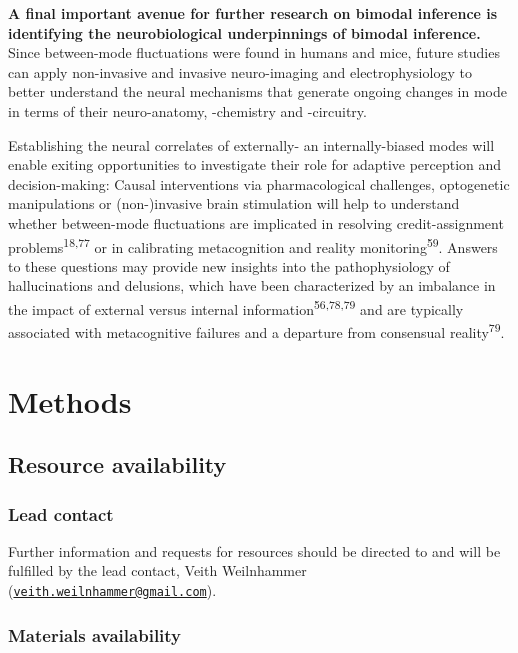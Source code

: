 \documentclass[
]{article}
\begin{document}
\textbf{A final important avenue for further research on bimodal
inference is identifying the neurobiological underpinnings of bimodal
inference.} Since between-mode fluctuations were found in humans and
mice, future studies can apply non-invasive and invasive neuro-imaging
and electrophysiology to better understand the neural mechanisms that
generate ongoing changes in mode in terms of their neuro-anatomy,
-chemistry and -circuitry.

Establishing the neural correlates of externally- an internally-biased
modes will enable exiting opportunities to investigate their role for
adaptive perception and decision-making: Causal interventions via
pharmacological challenges, optogenetic manipulations or (non-)invasive
brain stimulation will help to understand whether between-mode
fluctuations are implicated in resolving credit-assignment
problems\textsuperscript{18,77} or in calibrating metacognition and
reality monitoring\textsuperscript{59}. Answers to these questions may
provide new insights into the pathophysiology of hallucinations and
delusions, which have been characterized by an imbalance in the impact
of external versus internal information\textsuperscript{56,78,79} and
are typically associated with metacognitive failures and a departure
from consensual reality\textsuperscript{79}.

\newpage

\hypertarget{methods}{%
\section{Methods}\label{methods}}

\hypertarget{resource-availability}{%
\subsection{Resource availability}\label{resource-availability}}

\hypertarget{lead-contact}{%
\subsubsection{Lead contact}\label{lead-contact}}

Further information and requests for resources should be directed to and
will be fulfilled by the lead contact, Veith Weilnhammer
(\href{mailto:veith.weilnhammer@gmail.com}{\nolinkurl{veith.weilnhammer@gmail.com}}).

\hypertarget{materials-availability}{%
\subsubsection{Materials availability}\label{materials-availability}}
\end{document}

